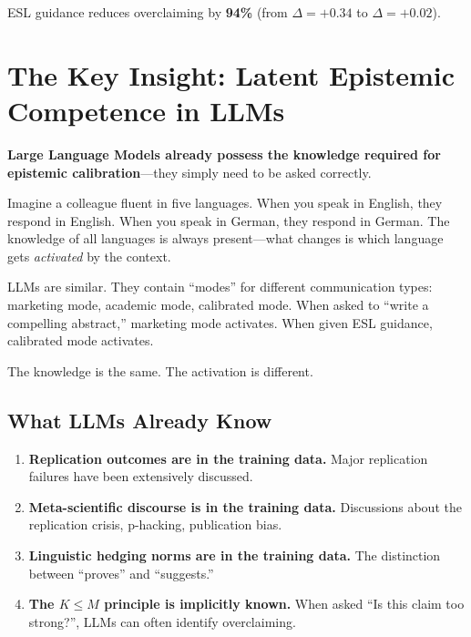 \documentclass[11pt,a4paper]{article}
\begin{document}
ESL guidance reduces overclaiming by \textbf{94\%} (from $\Delta = +0.34$ to $\Delta = +0.02$).



\section{The Key Insight: Latent Epistemic Competence in LLMs}

\textbf{Large Language Models already possess the knowledge required for epistemic calibration}---they simply need to be asked correctly.

\begin{analogybox}
Imagine a colleague fluent in five languages. When you speak in English, they respond in English. When you speak in German, they respond in German. The knowledge of all languages is always present---what changes is which language gets \emph{activated} by the context.

LLMs are similar. They contain ``modes'' for different communication types: marketing mode, academic mode, calibrated mode. When asked to ``write a compelling abstract,'' marketing mode activates. When given ESL guidance, calibrated mode activates.

The knowledge is the same. The activation is different.
\end{analogybox}


\subsection{What LLMs Already Know}

\begin{enumerate}
    \item \textbf{Replication outcomes are in the training data.} Major replication failures have been extensively discussed.
    \item \textbf{Meta-scientific discourse is in the training data.} Discussions about the replication crisis, p-hacking, publication bias.
    \item \textbf{Linguistic hedging norms are in the training data.} The distinction between ``proves'' and ``suggests.''
    \item \textbf{The $K \leq M$ principle is implicitly known.} When asked ``Is this claim too strong?'', LLMs can often identify overclaiming.
\end{enumerate}
\end{document}
